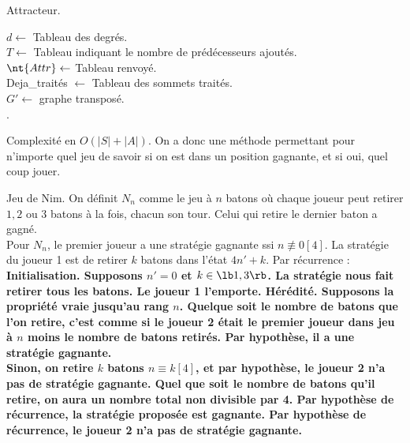 \documentclass[french, 11pt]{article}
\newcommand*{\Attr}{\nt{Attr}}
\begin{document}
\begin{defi}{Attracteur.}{}
    \begin{algorithm}[H]
        \caption{Calcul de l'attracteur.}
        $d\gets$ Tableau des degrés.\\
        $T\gets$ Tableau indiquant le nombre de prédécesseurs ajoutés.\\
        $\Attr \gets$ Tableau renvoyé.\\
        Deja\_traités $\gets$ Tableau des sommets traités.\\
        $G'\gets$ graphe transposé.\\
        \Retour{$\Attr$}.
    \end{algorithm}
    Complexité en $O(|S|+|A|)$. On a donc une méthode permettant pour n'importe quel jeu de savoir si on est dans un position gagnante, et si oui, quel coup jouer.
\end{defi}

\begin{ex}{Jeu de Nim.}{}
    On définit $N_n$ comme le jeu à $n$ batons où chaque joueur peut retirer $1,2$ ou $3$ batons à la fois, chacun son tour. Celui qui retire le dernier baton a gagné.\\
    Pour $N_n$, le premier joueur a une stratégie gagnante ssi $n\not\equiv0[4]$.
    \tcblower
    La stratégie du joueur 1 est de retirer $k$ batons dans l'état $4n'+k$. Par récurrence :\\
    \bf{Initialisation.} Supposons $n'=0$ et $k\in\lb1,3\rb$. La stratégie nous fait retirer tous les batons. Le joueur 1 l'emporte.
    \bf{Hérédité.} Supposons la propriété vraie jusqu'au rang $n$. Quelque soit le nombre de batons que l'on retire, c'est comme si le joueur 2 était le premier joueur dans jeu à $n$ moins le nombre de batons retirés. Par hypothèse, il a une stratégie gagnante.\\ Sinon, on retire $k$ batons $n\equiv k[4]$, et par hypothèse, le joueur 2 n'a pas de stratégie gagnante. Quel que soit le nombre de batons qu'il retire, on aura un nombre total non divisible par 4. Par hypothèse de récurrence, la stratégie proposée est gagnante.
    Par hypothèse de récurrence, le joueur 2 n'a pas de stratégie gagnante.
\end{ex}
\end{document}

